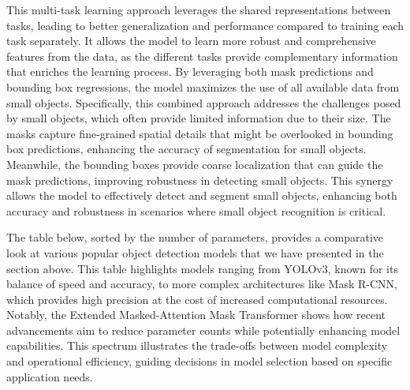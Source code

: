 This multi-task learning approach leverages the shared representations between tasks, leading to better generalization and performance compared to training each 
task separately. It allows the model to learn more robust and comprehensive features from the data, as the different tasks provide complementary information that 
enriches the learning process. By leveraging both mask predictions and bounding box regressions, the model maximizes the use of all available data from small objects. 
Specifically, this combined approach addresses the challenges posed by small objects, which often provide limited information due to their size. The masks capture 
fine-grained spatial details that might be overlooked in bounding box predictions, enhancing the accuracy of segmentation for small objects. Meanwhile, the bounding 
boxes provide coarse localization that can guide the mask predictions, improving robustness in detecting small objects. This synergy allows the model to effectively 
detect and segment small objects, enhancing both accuracy and robustness in scenarios where small object recognition is critical.

\vspace{1.5cm}

The table below, sorted by the number of parameters, provides a comparative look at various popular object detection models that we have presented in the 
section above. This table highlights models ranging from YOLOv3, known for its balance of speed and accuracy, to more complex architectures like Mask R-CNN, 
which provides high precision at the cost of increased computational resources. Notably, the Extended Masked-Attention Mask Transformer shows how recent 
advancements aim to reduce parameter counts while potentially enhancing model capabilities. This spectrum illustrates the trade-offs between model complexity 
and operational efficiency, guiding decisions in model selection based on specific application needs.

